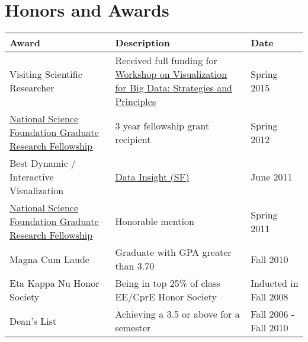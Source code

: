 \documentclass[oneside]{article}
\newcommand{\thinline}{\specialrule{.02em}{0em}{0em}}
\begin{document}
\vspace{1em}

\section{Honors and Awards}
\begin{tabular}{p{7cm}p{7cm}p{1.9cm}}
\textbf{Award} & \textbf{Description} & \textbf{Date} \\
\hline

Visiting Scientific Researcher &
Received full funding for \href{http://www.fields.utoronto.ca/programs/scientific/14-15/bigdata/visualization/}{Workshop on Visualization
for Big Data: Strategies and Principles} &
Spring 2015\\[0.5em]

\href{http://www.nsf.gov/grfp}{National Science Foundation Graduate \newline Research Fellowship} &
3 year fellowship grant recipient &
Spring 2012\\[0.5em]

\thinline

Best Dynamic / Interactive Visualization &
\href{http://datainsightsf.com/}{Data Insight (SF)} &
June 2011\\[0.5em]

\href{http://www.nsf.gov/grfp}{National Science Foundation Graduate \newline Research Fellowship} &
Honorable mention &
Spring 2011\\[0.5em]

\thinline

Magna Cum Laude &
Graduate with GPA greater than 3.70 &
Fall 2010\\[0.5em]




Eta Kappa Nu Honor Society &
Being in top 25\% of class \newline
EE/CprE Honor Society &
Inducted in\newline
Fall 2008\newline\\[0.5em]

Dean's List & Achieving a 3.5 or above for a semester&
Fall 2006 -\newline Fall 2010\\[0.5em]


\end{tabular}
\end{document}
